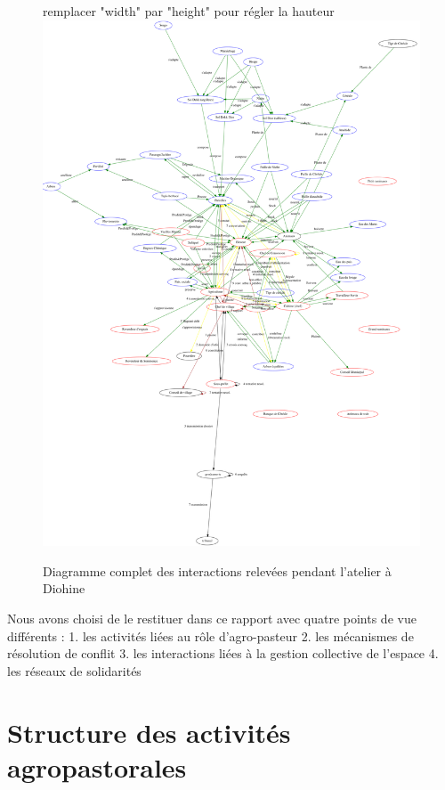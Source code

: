 \begin{figure}
\begin{center}
remplacer "width" par "height" pour régler la hauteur
\includegraphics[width=15cm]{img/pardi_fdp.png}
\end{center}
\caption{Diagramme complet des interactions relevées pendant l'atelier à Diohine }
\label{diag_complet}
\end{figure}




Nous avons choisi de le restituer dans ce rapport avec quatre points de vue différents : 
1. les activités liées au rôle d'agro-pasteur
2. les mécanismes de résolution de conflit
3. les interactions liées à la gestion collective de l'espace
4. les réseaux de solidarités

\section{Structure des activités agropastorales} 

